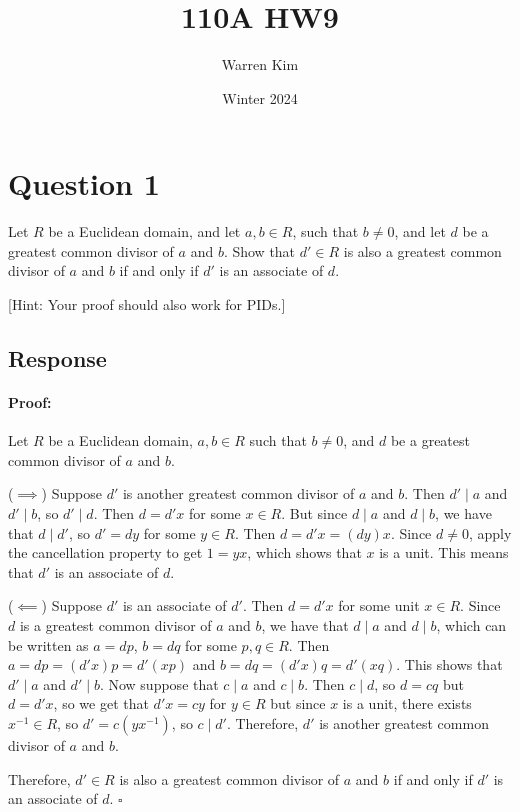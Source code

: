 \documentclass [12pt] {article}
\title{110A HW9}
\author{Warren Kim}
\date{Winter 2024}
\newenvironment{proof}{\paragraph{Proof:}}{\hfill$\square$}
\begin{document}
\maketitle

\section*{Question 1}
Let $R$ be a Euclidean domain, and let $a,b\in R$, such that $b\neq 0$, and let $d$ be a greatest
common divisor of $a$ and $b$. Show that $d'\in R$ is also a greatest common divisor of $a$ and $b$
if and only if $d'$ is an associate of $d$.

[Hint: Your proof should also work for PIDs.]
\subsection*{Response}
\begin{proof}
    Let $R$ be a Euclidean domain, $a, b \in R$ such that $b \neq 0$, and $d$ be a greatest common
    divisor of $a$ and $b$.

    ($\implies$)
    Suppose $d'$ is another greatest common divisor of $a$ and $b$. Then $d' \mid a$ and
    $d' \mid b$, so $d' \mid d$. Then $d = d'x$ for some $x \in R$. But since $d \mid a$ and
    $d \mid b$, we have that $d \mid d'$, so $d' = dy$ for some $y \in R$. Then $d = d'x = (dy)x$.
    Since $d \neq 0$, apply the cancellation property to get $1 = yx$, which shows that $x$ is a
    unit. This means that $d'$ is an associate of $d$.
    \vspace{0.5em}

    ($\impliedby$)
    Suppose $d'$ is an associate of $d'$. Then $d = d'x$ for some unit $x \in R$. Since $d$ is a
    greatest common divisor of $a$ and $b$, we have that $d \mid a$ and $d \mid b$, which can be
    written as $a = dp$, $b = dq$ for some $p, q \in R$. Then $a = dp = (d'x)p = d'(xp)$ and $b = dq
    = (d'x)q = d'(xq)$. This shows that $d' \mid a$ and $d' \mid b$. Now suppose that $c \mid a$ and
    $c \mid b$. Then $c \mid d$, so $d = cq$ but $d = d'x$, so we get that $d'x = cy$ for $y \in R$
    but since $x$ is a unit, there exists $x^{-1} \in R$, so $d' = c(yx^{-1})$, so $c \mid d'$.
    Therefore, $d'$ is another greatest common divisor of $a$ and $b$.
    \vspace{0.5em}

    Therefore, $d' \in R$ is also a greatest common divisor of $a$ and $b$ if and only if $d'$ is an
    associate of $d$.
\end{proof}
\newpage
\end{document}
